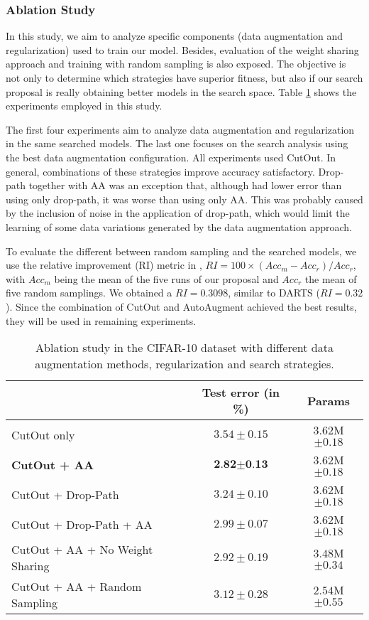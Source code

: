 \documentclass[conference]{IEEEtran}
\begin{document}
	\subsubsection{Ablation Study}
	
	In this study, we aim to analyze specific components (data augmentation and regularization) used to train our model. 
	Besides, evaluation of the weight sharing approach and training with random sampling is also exposed. 
	The objective is not only to determine which strategies have superior fitness, but also if our search proposal is really obtaining better models in the search space.
	Table \ref{tab:ablation} shows the experiments employed in this study.
	
	The first four experiments aim to analyze data augmentation and regularization in the same searched models. 
	The last one focuses on the search analysis using the best data augmentation configuration. 
	All experiments used CutOut.
	In general, combinations of these strategies improve accuracy satisfactory.
	Drop-path together with AA was an exception that, although had lower error than using only drop-path, it was worse than using only AA.
	This was probably caused by the inclusion of noise in the application of drop-path, which would limit the learning of some data variations generated by the data augmentation approach.
	
	To evaluate the different between random sampling and the searched models, we use the relative improvement (RI) metric in \cite{Yang2020NAS}, $RI = 100 \times(Acc_m - Acc_r)/Acc_r$, with $Acc_m$ being the mean of the five runs of our proposal and $Acc_r$ the mean of five random samplings.
	We obtained a $RI = 0.3098$, similar to DARTS ($RI=0.32$). 
	Since the combination of CutOut and AutoAugment  achieved the best results, they will be used in remaining experiments.
	
	\begin{table}[htb]
		\centering
		\caption{Ablation study in the CIFAR-10 dataset with different data augmentation methods, regularization and search strategies. }
		\label{tab:ablation}
		\begin{tabular}{@{}lcc@{}}
			\toprule
			& \textbf{Test error (in \%)} & \textbf{Params}  \\ \midrule
			CutOut only                     & $3.54\pm0.15$               & $3.62$M$\pm0.18$ \\
			\textbf{CutOut + AA}             & $\textbf{2.82}\pm\textbf{0.13}$               & $3.62$M$\pm0.18$ \\
			CutOut + Drop-Path               & $3.24\pm0.10$               & $3.62$M$\pm0.18$ \\
			CutOut + Drop-Path + AA          & $2.99\pm0.07$               & $3.62$M$\pm0.18$ \\ \midrule
			CutOut + AA + No Weight Sharing & $2.92\pm0.19$               & $3.48$M$\pm0.34$ \\
			CutOut + AA + Random Sampling   & $3.12\pm0.28$               & $2.54$M$\pm0.55$ \\ \bottomrule
		\end{tabular}
	\end{table}
	
\end{document}
